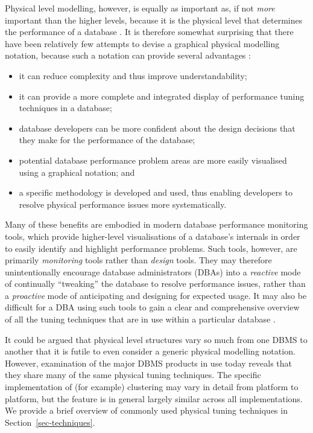 \documentclass{CRPITStyle}
\begin{document}
Physical level modelling, however, is equally as important as, if not
\emph{more} important than the higher levels, because it is the physical
level that determines the performance of a database \cite{BeDa-P-2003}.
It is therefore somewhat surprising that there have been relatively few
attempts to devise a graphical physical modelling notation, because such
a notation can provide several advantages
\cite{BeDa-P-1992-PDD,Conn-TM-2002,Tuft-ER-1997,Will-J-1992}:
\begin{itemize}

	\item it can reduce complexity and thus improve understandability;

	\item it can provide a more complete and integrated display of
	performance tuning techniques in a database;

	\item database developers can be more confident about the design
	decisions that they make for the performance of the database;

	\item potential database performance problem areas are more easily
	visualised using a graphical notation; and

	\item a specific methodology is developed and used, thus enabling
	developers to resolve physical performance issues more
	systematically.

\end{itemize}

Many of these benefits are embodied in modern database performance
monitoring tools, which provide higher-level visualisations of a
database's internals in order to easily identify and highlight
performance problems. Such tools, however, are primarily
\emph{monitoring} tools rather than \emph{design} tools. They may
therefore unintentionally encourage database administrators (DBAs) into
a \emph{reactive} mode of continually ``tweaking'' the database to
resolve performance issues, rather than a \emph{proactive} mode of
anticipating and designing for expected usage. It may also be difficult
for a DBA using such tools to gain a clear and comprehensive overview of
all the tuning techniques that are in use within a particular database
\cite{Core-MJ-1997-OracleDW}.

It could be argued that physical level structures vary so much from one
DBMS to another that it is futile to even consider a generic physical
modelling notation. However, examination of the major DBMS products in
use today reveals that they share many of the same physical tuning
techniques. The specific implementation of (for example) clustering may
vary in detail from platform to platform, but the feature is in general
largely similar across all implementations. We provide a brief overview
of commonly used physical tuning techniques in
Section~\ref{sec-techniques}.
\end{document}
